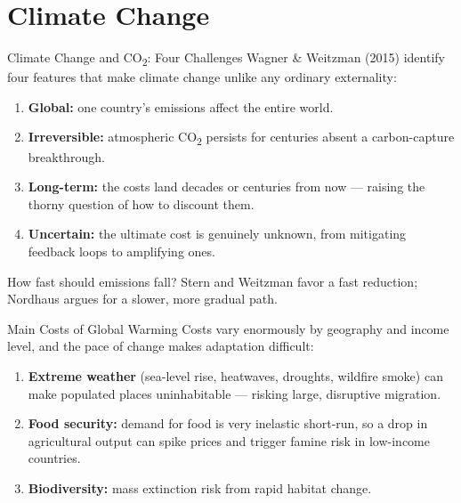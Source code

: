 \documentclass[11pt,aspectratio=169]{beamer}
\begin{document}
\section{Climate Change}

\begin{frame}{Climate Change and CO\textsubscript{2}: Four Challenges}
  Wagner \& Weitzman (2015) identify four features that make climate change unlike any ordinary externality:
  \begin{enumerate}
    \item \textbf{Global:} one country's emissions affect the entire world.
    \item \textbf{Irreversible:} atmospheric CO\textsubscript{2} persists for centuries absent a carbon-capture breakthrough.
    \item \textbf{Long-term:} the costs land decades or centuries from now --- raising the thorny question of how to discount them.
    \item \textbf{Uncertain:} the ultimate cost is genuinely unknown, from mitigating feedback loops to amplifying ones.
  \end{enumerate}
  \vspace{0.3em}
  \small How fast should emissions fall? Stern and Weitzman favor a fast reduction; Nordhaus argues for a slower, more gradual path.
\end{frame}

\begin{frame}{Main Costs of Global Warming}
  Costs vary enormously by geography and income level, and the pace of change makes adaptation difficult:
  \begin{enumerate}
    \item \textbf{Extreme weather} (sea-level rise, heatwaves, droughts, wildfire smoke) can make populated places uninhabitable --- risking large, disruptive migration.
    \item \textbf{Food security:} demand for food is very inelastic short-run, so a drop in agricultural output can spike prices and trigger famine risk in low-income countries.
    \item \textbf{Biodiversity:} mass extinction risk from rapid habitat change.
  \end{enumerate}
\end{frame}
\end{document}
